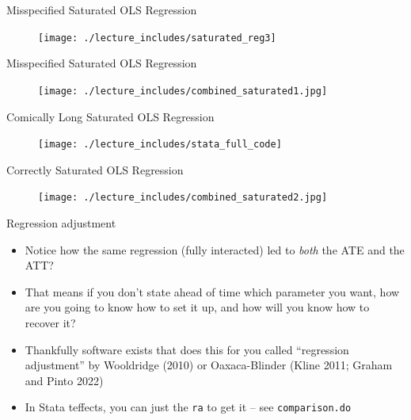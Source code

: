 \documentclass{beamer}
\begin{document}
\begin{frame}{Misspecified Saturated OLS Regression}

\begin{figure}[!t]\centering
\texttt{[image: ./lecture\_includes/saturated\_reg3]}
\end{figure}

\end{frame}


\begin{frame}{Misspecified Saturated OLS Regression}

\begin{figure}[!t]\centering
\texttt{[image: ./lecture\_includes/combined\_saturated1.jpg]}
\end{figure}

\end{frame}

\begin{frame}{Comically Long Saturated OLS Regression}

\begin{figure}[!t]\centering
\texttt{[image: ./lecture\_includes/stata\_full\_code]}
\end{figure}

\end{frame}

\begin{frame}{Correctly Saturated OLS Regression}

\begin{figure}[!t]\centering
\texttt{[image: ./lecture\_includes/combined\_saturated2.jpg]}
\end{figure}

\end{frame}

\begin{frame}{Regression adjustment}

\begin{itemize}

\item Notice how the same regression (fully interacted) led to \emph{both} the ATE and the ATT?
\item That means if you don't state ahead of time which parameter you want, how are you going to know how to set it up, and how will you know how to recover it?
\item Thankfully software exists that does this for you called ``regression adjustment'' by Wooldridge (2010) or Oaxaca-Blinder (Kline 2011; Graham and Pinto 2022) 
\item In Stata teffects, you can just the \texttt{ra} to get it -- see \texttt{comparison.do}

\end{itemize}

\end{frame}
\end{document}
